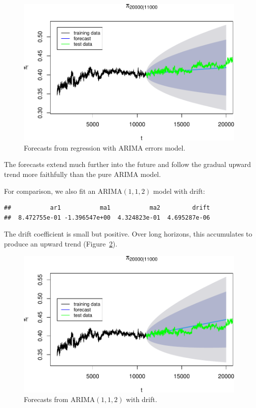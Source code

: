 \documentclass[final,11pt]{article}
\theoremstyle{plain}
\theoremstyle{remark}
\begin{document}
\begin{figure}
\includegraphics{paper_files/figure-latex/unnamed-chunk-20-1.pdf}
\caption{Forecasts from regression with ARIMA errors model.}
\label{fig:theory}
\end{figure}

The forecasts extend much further into the future and follow the gradual
upward trend more faithfully than the pure ARIMA model.

For comparison, we also fit an ARIMA$(1,1,2)$ model with drift:

\begin{verbatim}
##           ar1           ma1           ma2         drift
##  8.472755e-01 -1.396547e+00  4.324823e-01  4.695287e-06
\end{verbatim}

The drift coefficient is small but positive. Over long horizons, this
accumulates to produce an upward trend (Figure~\ref{fig:drift}).

\begin{figure}
\includegraphics{paper_files/figure-latex/unnamed-chunk-22-1.pdf}
\caption{Forecasts from ARIMA$(1,1,2)$ with drift.}
\label{fig:drift}
\end{figure}
\end{document}
